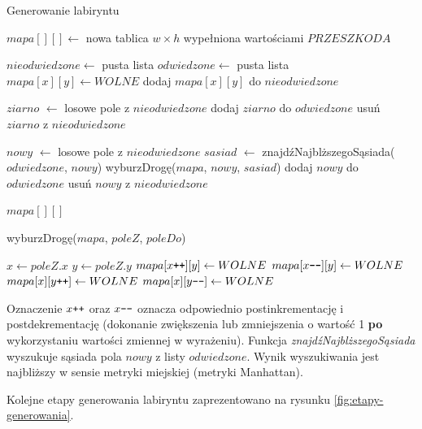 \begin{algorithm}[H]
  \caption{Generowanie labiryntu}\label{alg:mazegen}
  \begin{algorithmic}[1]

\STATE $mapa[][] \gets$ nowa tablica $w \times h$ wypełniona wartościami $PRZESZKODA$

\STATE $nieodwiedzone \gets$ pusta lista
\STATE $odwiedzone \gets$ pusta lista
		\STATE $mapa[x][y] \gets WOLNE$
		\STATE dodaj $mapa[x][y]$ do $nieodwiedzone$
	\ENDFOR
\ENDFOR

\STATE $ziarno$ $\gets$ losowe pole z $nieodwiedzone$
\STATE dodaj $ziarno$ do $odwiedzone$
\STATE usuń $ziarno$ z $nieodwiedzone$

	\STATE $nowy$ $\gets$ losowe pole z $nieodwiedzone$
	\STATE $sasiad$ $\gets$ znajdźNajblższegoSąsiada($odwiedzone$, $nowy$)
	\STATE wyburzDrogę($mapa$, $nowy$, $sasiad$)
	\STATE dodaj $nowy$ do $odwiedzone$
	\STATE usuń $nowy$ z $nieodwiedzone$
\ENDWHILE

\RETURN $mapa[][]$

\STATE 
{} wyburzDrogę($mapa$, $poleZ$, $poleDo$)
	\begin{ALC@g}
	\STATE $x \gets poleZ.x$
	\STATE $y \gets poleZ.y$
		\STATE $mapa[x\verb-++-][y] \gets WOLNE$ 
	\ENDWHILE
		\STATE $mapa[x\verb+--+][y] \gets WOLNE$
	\ENDWHILE
		\STATE $mapa[x][y\verb-++-] \gets WOLNE$
	\ENDWHILE
		\STATE $mapa[x][y\verb+--+] \gets WOLNE$
	\ENDWHILE
	\end{ALC@g}
	\end{algorithmic}
\end{algorithm}

Oznaczenie $x\verb-++-$ oraz $x\verb+--+$ oznacza odpowiednio postinkrementację i postdekrementację (dokonanie zwiększenia lub zmniejszenia o wartość 1 {\bf po} wykorzystaniu wartości zmiennej w wyrażeniu).
Funkcja {\it znajdźNajblższegoSąsiada} wyszukuje sąsiada pola $nowy$ z listy $odwiedzone$. Wynik wyszukiwania jest najbliższy w sensie metryki miejskiej (metryki Manhattan).

Kolejne etapy generowania labiryntu zaprezentowano na rysunku \ref{fig:etapy-generowania}.

